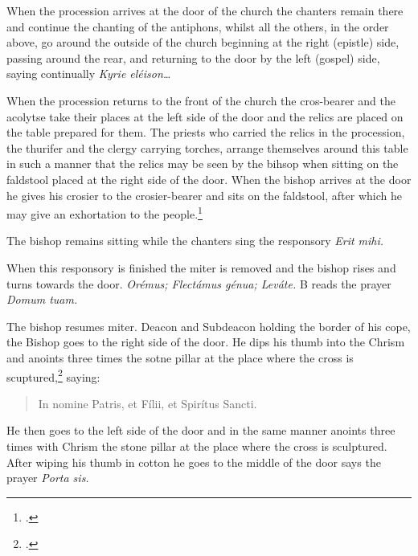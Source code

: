 \documentclass[letterpaper]{report}
\begin{document}
{When the procession arrives at the door of the church the chanters remain there
and continue the chanting of the antiphons, whilst all the others, in the order
above, go around the outside of the church beginning at the right (epistle)
side, passing around the rear, and returning to the door by the left (gospel)
side, saying continually \textit{Kyrie eléison\dots}

\rubric When the procession returns to the front of the church the cros-bearer
and the acolytse take their places at the left side of the door and the relics
are placed on the table prepared for them. The priests who carried the relics
in the procession, the thurifer and the clergy carrying torches, arrange
themselves around this table in such a manner that the relics may be seen by
the bihsop when sitting on the faldstool placed at the right side of the door.
When the bishop arrives at the door he gives his crosier to the crosier-bearer
and sits on the faldstool, after which he may give an exhortation to the
people.\footcite[The exhortation here spoken of, the decrees of the Council of
Trent which according to the Pontifical are now read by the archdeacon (any
priest), the address of the Bishop to the founder of the church and the
latter's reply may be omitted. --- S.R.C., May 17, 1890, n. 3729 ad
VIII.][footnote 2, p. 82.]{consecranda}

\rubric The bishop remains sitting while the chanters sing the responsory
\textit{Erit mihi.}

\rubric When this responsory is finished the miter is removed and the bishop
rises and turns towards the door. \textit{Orémus; Flectámus génua; Leváte.} B
reads the prayer \textit{Domum tuam.}

\rubric The bishop resumes miter. Deacon and Subdeacon holding the border of
his cope, the Bishop goes to the right side of the door. He dips his thumb into
the Chrism and anoints three times the sotne pillar at the place where the
cross is scuptured,\footcite[The Pontifical says ''\textit{signat ostium,''}
which the S.R.C., Aug. 7, 1875, n. 3364 ad VI, interprets to mean the two stone
or brick pillars at the sides of the door.][footnote 1, p. 83.]{consecranda}
saying:

\begin{quote}
   In nomine Pa\cross tris, et Fí\cross lii, et Spirítus \cross Sancti.
\end{quote}

He then goes to the left side of the door and in the same manner anoints three
times with Chrism the stone pillar at the place where the cross is sculptured.
After wiping his thumb in cotton he goes to the middle of the door says the
prayer \textit{Porta sis.}

}
\end{document}
